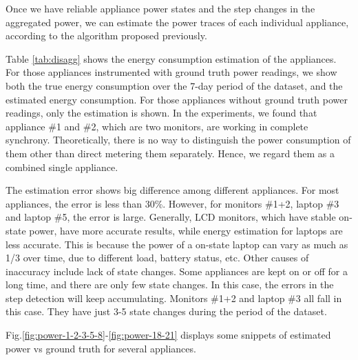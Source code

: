 Once we have reliable appliance power states and the step changes in the aggregated power, we can estimate the power traces of each individual appliance, according to the algorithm proposed previously. 

Table \ref{tab:disagg} shows the energy consumption estimation of the appliances. For those appliances instrumented with ground truth power readings, we show both the true energy consumption over the 7-day period of the dataset, and the estimated energy consumption. For those appliances without ground truth power readings, only the estimation is shown. In the experiments, we found that appliance \#1 and \#2, which are two monitors, are working in complete synchrony. Theoretically, there is no way to distinguish the power consumption of them other than direct metering them separately. Hence, we regard them as a combined single appliance. 

The estimation error shows big difference among different appliances. For most appliances, the error is less than 30\%. However, for monitors \#1+2, laptop \#3 and laptop \#5, the error is large. Generally, LCD monitors, which have stable on-state power, have more accurate results, while energy estimation for laptops are less accurate. This is because the power of a on-state laptop can vary as much as 1/3 over time, due to different load, battery status, etc. Other causes of inaccuracy include lack of state changes. Some appliances are kept on or off for a long time, and there are only few state changes. In this case, the errors in the step detection will keep accumulating. Monitors \#1+2 and laptop \#3 all fall in this case. They have just 3-5 state changes during the period of the dataset. 

Fig.\ref{fig:power-1-2-3-5-8}-\ref{fig:power-18-21} displays some snippets of estimated power vs ground truth for several appliances. 

